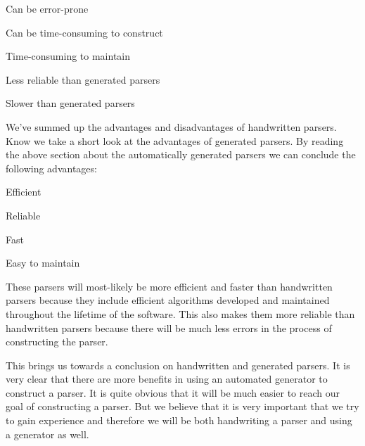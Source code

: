 \begin{dlist}
\item Can be error-prone
\item Can be time-consuming to construct
\item Time-consuming to maintain
\item Less reliable than generated parsers
\item Slower than generated parsers
\end{dlist}

We've summed up the advantages and disadvantages of handwritten parsers. Know we
take a short look at the advantages of generated parsers. By reading the above
section about the automatically generated parsers we can conclude the following
advantages:

\begin{dlist}
\item Efficient
\item Reliable
\item Fast
\item Easy to maintain
\end{dlist}

These parsers will most-likely be more efficient and faster than handwritten
parsers because they include efficient algorithms developed and maintained
throughout the lifetime of the software. This also makes them more reliable than
handwritten parsers because there will be much less errors in the process of
constructing the parser.

This brings us towards a conclusion on handwritten and generated parsers. It is
very clear that there are more benefits in using an automated generator to
construct a parser. It is quite obvious that it will be much easier to reach our
goal of constructing a parser. But we believe that it is very important that we
try to gain experience and therefore we will be both handwriting a parser and
using a generator as well.
